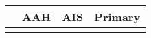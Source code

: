 \begin{tabular}{lccc}
\toprule
{} & AAH & AIS & Primary \\
\midrule
{} &     &     &         \\
\bottomrule
\end{tabular}

